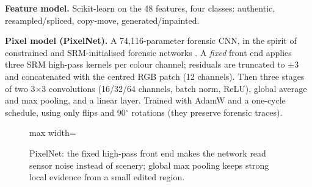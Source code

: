 \textbf{Feature model.} Scikit-learn  on the 48 features, four classes: authentic, resampled/spliced, copy-move, generated/inpainted.

\textbf{Pixel model (PixelNet).} A 74,116-parameter forensic CNN, in the spirit of constrained and SRM-initialised forensic networks \cite{bayar,fridrich2012}. A \emph{fixed} front end applies three SRM high-pass kernels per colour channel; residuals are truncated to $\pm3$ and concatenated with the centred RGB patch (12 channels). Then three stages of two 3$\times$3 convolutions (16/32/64 channels, batch norm, ReLU), global average and max pooling, and a linear layer. Trained with AdamW and a one-cycle schedule, using only flips and 90$^\circ$ rotations (they preserve forensic traces).

\begin{figure}[!htbp]
\centering
\begin{adjustbox}{max width=\textwidth}
\end{adjustbox}
\caption{PixelNet: the fixed high-pass front end makes the network read sensor noise instead of scenery; global max pooling keeps strong local evidence from a small edited region.}
\end{figure}

